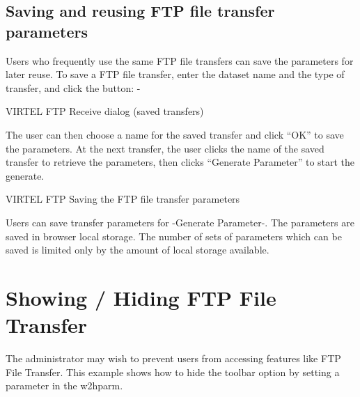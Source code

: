 \documentclass[letterpaper,10pt,english]{sphinxmanual}
\begin{document}
\section{Saving and reusing FTP file transfer parameters}
\label{\detokenize{TN201905:saving-and-reusing-ftp-file-transfer-parameters}}
Users who frequently use the same FTP file transfers can save the parameters for later reuse. To save a FTP file transfer, enter the dataset name and the type of transfer, and click the  button: -


VIRTEL FTP Receive dialog (saved transfers)

The user can then choose a name for the saved transfer and click “OK” to save the parameters. At the next transfer, the user clicks the name of the saved transfer to retrieve the parameters, then clicks “Generate Parameter” to start the generate.


VIRTEL FTP Saving the FTP file transfer parameters

Users can save transfer parameters for -Generate Parameter-. The parameters are saved in browser local storage. The number of sets of parameters which can be saved is limited only by the amount of local storage available.


\chapter{Showing / Hiding FTP File Transfer}
\label{\detokenize{TN201905:showing-hiding-ftp-file-transfer}}
The administrator may wish to prevent users from accessing features like FTP File Transfer. This example shows how to hide the toolbar option by setting a parameter in the w2hparm.


\begin{sphinxVerbatim}[commandchars=\\\{\}]
          
  
\end{sphinxVerbatim}

\end{document}
